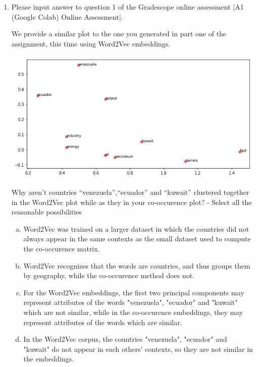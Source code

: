 \begin{enumerate}[1.]
\item {}

Please input answer to question 1 of the Gradescope online assessment |A1 (Google Colab) Online Assessment|.

We provide a similar plot to the one you generated in part one of the assignment, this time using Word2Vec embeddings.

\begin{center}
\includegraphics[width=1\textwidth]{embeddings_plot.png}
\end{center}

Why aren't countries ``venezuela'',``ecuador'' and ``kuwait'' clustered together in the Word2Vec plot while as they in your co-occurence plot? - Select all the reasonable possibilities

\begin{enumerate}[a.]
\item Word2Vec was trained on a larger dataset in which the countries did not always appear in the same contexts as the small dataset used to compute the co-occurence matrix.
\item Word2Vec recognizes that the words are countries, and thus groups them by geography, while the co-occurence method does not. 
\item For the Word2Vec embeddings, the first two principal components may represent attributes of the words "venezuela", "ecuador" and "kuwait" which are not similar, while in the co-occurence embeddings, they may represent attributes of the words which are similar. 
\item In the Word2Vec corpus, the countries "venezuela", "ecuador" and "kuwait" do not appear in each others’ contexts, so they are not similar in the embeddings.
\end{enumerate}


\end{enumerate}

